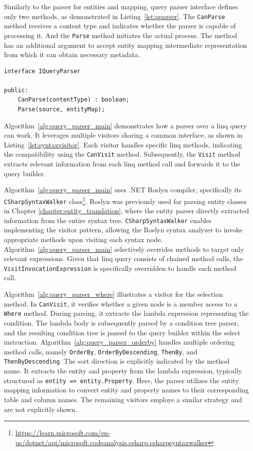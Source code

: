 Similarly to the parser for entities and mapping, query parser interface defines only two methods, as demonstrated in Listing~\ref{lst:qparser}. The \texttt{CanParse} method receives a content type and indicates whether the parser is capable of processing it. And the \texttt{Parse} method initiates the actual process. The method has an additional argument to accept entity mapping intermediate representation from which it can obtain necessary metadata.  

 \begin{lstlisting}[caption={IQueryParser interface structure}, language=pseudo, label={lst:qparser}]
interface IQueryParser

public:
    CanParse(contentType) : boolean;
    Parse(source, entityMap);
 \end{lstlisting}

 Algorithm~\ref{alg:query_parser_main} demonstrates how a parser over a \acrshort{linq} query can work. It leverages multiple visitors sharing a common interface, as shown in Listing~\ref{lst:syntaxvisitor}. Each visitor handles specific \acrshort{linq} methods, indicating the compatibility using the \texttt{CanVisit} method. Subsequently, the \texttt{Visit} method extracts relevant information from each \acrshort{linq} method call and forwards it to the query builder.

 Algorithm~\ref{alg:query_parser_main} uses .NET Roslyn compiler, specifically its \texttt{CSharpSyntaxWalker} class\footnote{\url{https://learn.microsoft.com/en-us/dotnet/api/microsoft.codeanalysis.csharp.csharpsyntaxwalker}}. Roslyn was previously used for parsing entity classes in Chapter \ref{chapter:entity_translation}, where the entity parser directly extracted information from the entire syntax tree. \texttt{CSharpSyntaxWalker} enables implementing the visitor pattern, allowing the Roslyn syntax analyzer to invoke appropriate methods upon visiting each syntax node. Algorithm~\ref{alg:query_parser_main} selectively overrides methods to target only relevant expressions. Given that \acrshort{linq} query consists of chained method calls, the \texttt{VisitInvocationExpression} is specifically overridden to handle each method call.

 Algorithm~\ref{alg:query_parser_where} illustrates a visitor for the selection method. In \texttt{CanVisit}, it verifies whether a given node is a member access to a \texttt{Where} method. During parsing, it extracts the lambda expression representing the condition. The lambda body is subsequently parsed by a condition tree parser, and the resulting condition tree is passed to the query builder within the select instruction.
 Algorithm~\ref{alg:query_parser_orderby} handles multiple ordering method calls, namely \texttt{OrderBy}, \texttt{OrderByDescending}, \texttt{ThenBy}, and \texttt{ThenByDescending}. The sort direction is explicitly indicated by the method name. It extracts the entity and property from the lambda expression, typically structured as \texttt{entity => entity.Property}. Here, the parser utilizes the entity mapping information to convert entity and property names to their corresponding table and column names. The remaining visitors employe a similar strategy and are not explicitly shown.

